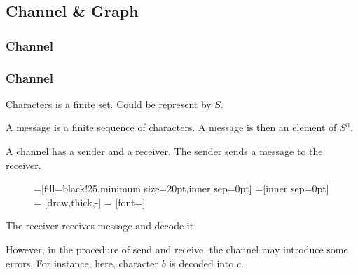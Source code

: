 \subsection{\texorpdfstring{Channel \& Graph}{Channel and Graph}}

\subsubsection*{Channel}

      \begin{frame}
            \frametitle{Channel}
            \begin{definition}[channel]
                  Characters is a finite set.
                  Could be represent by $S$.

                  A message is a finite sequence of characters.
                  A message is then an element of $S^{n}$.

                  A channel has a sender and a receiver.
                  The sender sends a message to the receiver.
                  \begin{figure}[h!]
                        =[fill=black!25,minimum size=20pt,inner sep=0pt]
                        =[inner sep=0pt]
                         = [draw,thick,-]
                         = [font=\small]
                  \end{figure}
                  \pause
                  
                  The receiver receives message and decode it.
                  \pause

                  However, in the procedure of send and receive, the channel may introduce some errors. For instance, here, character $b$ is decoded into $c$. 
            \end{definition}
      \end{frame}

